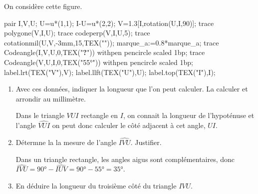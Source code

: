 \begin{corrige}
    On considère cette figure.

    \begin{Geometrie}
        pair I,V,U;
        U=u*(1,1);
        I-U=u*(2,2);
        V=1.3[I,rotation(U,I,90)];
        trace polygone(V,I,U);
        trace codeperp(V,I,U,5);
        trace cotationmil(U,V,-3mm,15,TEX(""));
        marque_a:=0.8*marque_a;                
        trace Codeangle(I,V,U,0,TEX("\textbf{?}")) withpen pencircle scaled 1bp;
        trace Codeangle(V,U,I,0,TEX("\ang{55}")) withpen pencircle scaled 1bp;
        label.lrt(TEX("V"),V);
        label.llft(TEX("U"),U);
        label.top(TEX("I"),I);
    \end{Geometrie}

    \begin{enumerate}
        \item Avec ces données, indiquer la longueur que l'on peut calculer. La calculer et arrondir au millimètre.
        
        {\color{red}Dans le triangle $VUI$ rectangle en $I$, on connait la longueur de l'hypoténuse et l'angle $\widehat{VUI}$ on peut donc calculer le côté adjacent à cet angle, $UI$.

        }
        \item Détermne la la mesure de l'angle $\widehat{IVU}$. Justifier.
        
        {\color{red} Dans un triangle rectangle, les angles aigus sont complémentaires, donc $\widehat{IVU}=\ang{90}-\widehat{IUV}=\ang{90}-\ang{55}=\ang{35}$.}
        \item En déduire la longueur du troisième côté du triangle $IVU$.
        
        {\color{red}}
    \end{enumerate}
\end{corrige}

